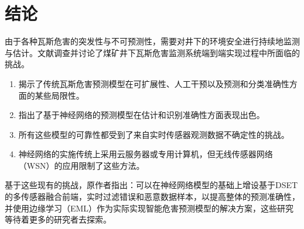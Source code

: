 \documentclass[lang=cn,a4paper,citestyle=gb7714-2015, bibstyle=gb7714-2015]{elegantpaper}
\begin{document}
    \section{结论}
    由于各种瓦斯危害的突发性与不可预测性，需要对井下的环境安全进行持续地监测与估计。文献调查并讨论了煤矿井下瓦斯危害监测系统端到端实现过程中所面临的挑战。
    \begin{enumerate}[label=(\arabic*)]
        \item 揭示了传统瓦斯危害预测模型在可扩展性、人工干预以及预测和分类准确性方面的某些局限性。
        \item 指出了基于神经网络的预测模型在估计和识别准确性方面表现出色。
        \item 所有这些模型的可靠性都受到了来自实时传感器观测数据不确定性的挑战。
        \item 神经网络的实施传统上采用云服务器或专用计算机，但无线传感器网络（WSN）的应用限制了这些方法。
    \end{enumerate}

    基于这些现有的挑战，原作者指出：可以在神经网络模型的基础上增设基于DSET的多传感器融合前端，实时过滤错误和恶意数据样本，以提高整体的预测准确性，并使用边缘学习（EML）作为实际实现智能危害预测模型的解决方案，这些研究等待着更多的研究者去探索。

    \printbibliography[heading=bibintoc, title=\ebibname]
\end{document}
